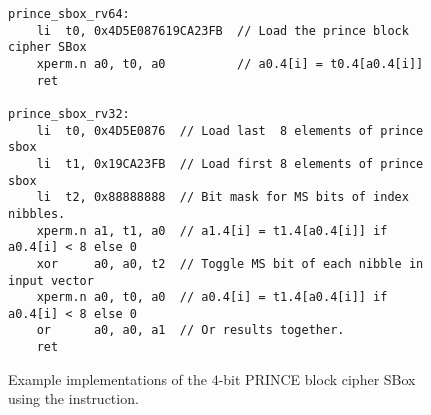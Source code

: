 \begin{figure}[h]
\begin{lstlisting}[style=ASM]
prince_sbox_rv64:
    li  t0, 0x4D5E087619CA23FB  // Load the prince block cipher SBox
    xperm.n a0, t0, a0          // a0.4[i] = t0.4[a0.4[i]]
    ret

prince_sbox_rv32:
    li  t0, 0x4D5E0876  // Load last  8 elements of prince sbox
    li  t1, 0x19CA23FB  // Load first 8 elements of prince sbox
    li  t2, 0x88888888  // Bit mask for MS bits of index nibbles.
    xperm.n a1, t1, a0  // a1.4[i] = t1.4[a0.4[i]] if a0.4[i] < 8 else 0
    xor     a0, a0, t2  // Toggle MS bit of each nibble in input vector
    xperm.n a0, t0, a0  // a0.4[i] = t1.4[a0.4[i]] if a0.4[i] < 8 else 0
    or      a0, a0, a1  // Or results together.
    ret
\end{lstlisting}
\caption{
    Example implementations of the $4$-bit PRINCE\cite{block:prince}
    block cipher SBox using the  instruction.
}
\label{fig:example:xperm}
\end{figure}
